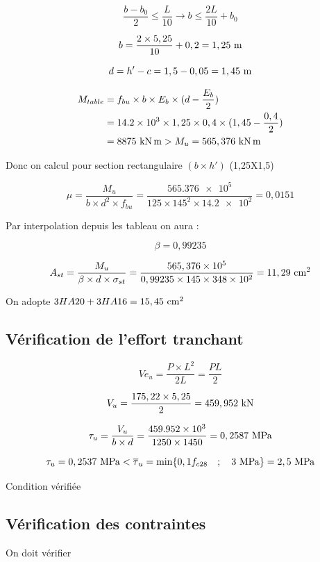 \documentclass[12pt,a4paper]{report}
\newcommand{\sgma}[1]{\sigma_{#1}}
\newcommand{\taubar}[1]{\overline{\tau}_{#1}}
\begin{document}
	\[ \dfrac{b - b_{0}}{2} \leq \dfrac{L}{10} \rightarrow b \leq \dfrac{2L}{10} + b_{0} \]
	
	\[ b = \dfrac{2 \times 5,25}{10} + 0,2 = 1,25\meterl \]
	
	\[ d = h' - c = 1,5 - 0,05 = 1,45\meterl \]
	
	\[ \begin{aligned}
		M_{table} &= f_{bu} \times b \times E_{b} \times (d - \dfrac{E_{b}}{2}) \\
		&= \num{14,2e3} \times 1,25 \times 0,4 \times (1,45 - \dfrac{0,4}{2}) \\
		&= 8875\knxm > M_{u} = 565,376\knxm
	\end{aligned} \]
	
	Donc on calcul pour section rectangulaire $(b \times h')$ (1,25X1,5)
	
	\[ \mu = \dfrac{M_{u}}{b \times d^{2} \times f_{bu}} = \dfrac{\num{565,376e5}}{125 \times 145^{2} \times \num{14,2e2}} = 0,0151 \]
	
	Par interpolation depuis les tableau on aura : 
	
	\[ \beta = 0,99235 \]
	
	\[ A_{st} = \dfrac{M_{u}}{\beta \times d \times \sgma{st}} = \dfrac{565,376 \times 10^{5}}{0,99235 \times 145 \times \num{348e2}} = 11,29\cmsq \]
	
	On adopte $3HA20 + 3HA16 = 15,45\cmsq$
	
	
	\subsection{Vérification de l'effort tranchant}
	
	\[ Ve_{u} = \dfrac{P \times L^{2}}{2L} = \dfrac{PL}{2} \]
	
	\[ V_{u} = \dfrac{175,22 \times 5,25}{2} = 459,952\kn \]
	
	\[ \tau_{u} = \dfrac{V_{u}}{b \times d} = \dfrac{\num{459,952e3}}{1250 \times 1450} = 0,2587\mpa \]
	
	\[ \tau_{u} = 0,2537\mpa < \taubar{u} = \min \{ 0,1f_{c28} \quad;\quad 3\mpa \} = 2,5\mpa \]
	
	{\centering Condition vérifiée \par}
	
	
	\subsection{Vérification des contraintes}
	
	On doit vérifier
	
\end{document}
